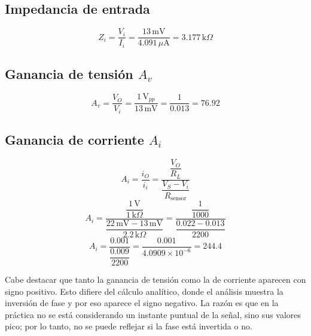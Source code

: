     
    \noindent
    \begin{minipage}[t]{0.48\linewidth}
        \subsection*{Impedancia de entrada}
        \[
        Z_i = \frac{V_i}{I_i}
             = \frac{13\,\text{mV}}{4.091\,\mu\text{A}}
             = \boxed{3.177\,\text{k}\Omega}
        \]
    
        \subsection*{Ganancia de tensión $A_v$}
        \[
        A_v=\frac{V_O}{V_i}
             =\frac{1\,\text{V}_{pp}}{13\,\text{mV}}
             =\frac{1}{0.013}
             =\boxed{76.92}
        \]
    \end{minipage}\hfill
    \begin{minipage}[t]{0.48\linewidth}
        \subsection*{Ganancia de corriente $A_i$}
        \[
        A_i=\frac{i_O}{i_i}
            =\frac{\dfrac{V_O}{R_L}}{\dfrac{V_S - V_i}{R_{\text{sensor}}}}
        \]
        \[
        A_i=\frac{\dfrac{1\,\text{V}}{1\,\text{k}\Omega}}{\dfrac{22\,\text{mV}-13\,\text{mV}}{2.2\,\text{k}\Omega}}
            =\frac{\dfrac{1}{1000}}{\dfrac{0.022-0.013}{2200}}
        \]
        \[
        A_i=\frac{0.001}{\dfrac{0.009}{2200}}
            =\frac{0.001}{4.0909\times10^{-6}}
            =\boxed{244.4}
        \]
    \end{minipage}
    \vspace{0.5cm}

      Cabe destacar que tanto la ganancia de tensión como la de corriente aparecen con signo positivo. Esto difiere del 
      cálculo analítico, donde el análisis muestra la inversión de fase y por eso aparece el signo negativo. La razón 
      es que en la práctica no se está considerando un instante puntual de la señal, sino sus valores pico; por lo 
      tanto, no se puede reflejar si la fase está invertida o no.


